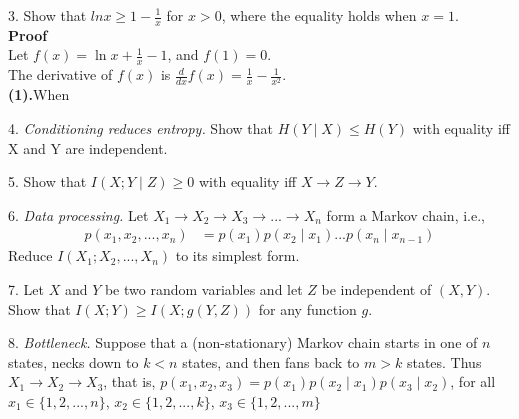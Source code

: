 \documentclass[12pt]{article}
\begin{document}
	\par
	3. Show that $lnx\geq1-\frac{1}{x}$ for $x>0$, where the equality holds when $x=1$. \\
	\textbf{Proof} \\
	Let $f(x) = \ln x + \frac{1}{x} - 1$, and $f(1) = 0$. \\
	The derivative of $f(x)$ is $\frac{d}{dx}f(x) = \frac{1}{x}-\frac{1}{x^2}$. \\
	\textbf{(1).}When 
	
	\par
	4. \textit{Conditioning reduces entropy.} Show that $H(Y{\mid}X) \leq H(Y)$ with equality iff X and Y are independent.
	
	\par 
	5. Show that $I(X;Y{\mid}Z)\geq0$ with equality iff $X\rightarrow Z\rightarrow Y$.  
	
	\par 
	6. \textit{Data processing.} Let $X_1\rightarrow X_2\rightarrow X_3\rightarrow ... \rightarrow X_n$ form a Markov chain, i.e., 
	\begin{align*}
		p(x_1,x_2,...,x_n) &= p(x_1)p(x_2{\mid}x_1)...p(x_n{\mid}x_{n-1})
	\end{align*}
	Reduce $I(X_1;X_2,...,X_n)$ to its simplest form.
	
	\par 
	7. Let $X$ and $Y$ be two random variables and let $Z$ be independent of $(X,Y)$. Show that $I(X;Y)\geq I(X;g(Y,Z))$ for any function $g$.
	
	\par 
	8. \textit{Bottleneck.} Suppose that a (non-stationary) Markov chain starts in one of $n$ states, necks down to $k<n$ states, and then fans back to $m>k$ states. Thus $X_1\rightarrow X_2\rightarrow X_3$, that is, $p(x_1,x_2,x_3) = p(x_1)p(x_2{\mid}x_1)p(x_3{\mid}x_2)$, for all $x_1\in\{1,2,...,n\}$, $x_2\in\{1,2,...,k\}$, $x_3\in\{1,2,...,m\}$
\end{document}
